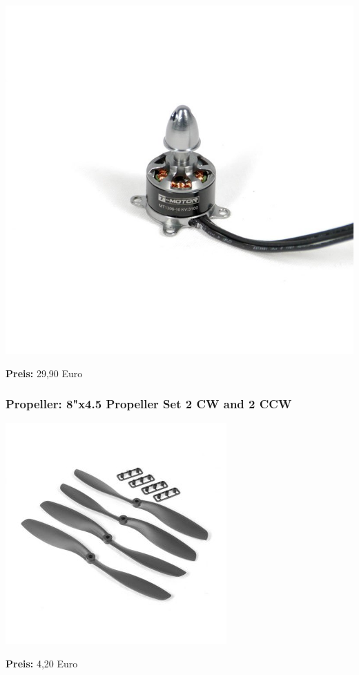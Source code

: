 \documentclass[12pt,a4paper]{article}
\begin{document}
\includegraphics[scale=0.2]{Bilder/T-Motor.jpg}

\textbf{Preis:} 29,90 Euro

\subsubsection*{Propeller: 8"x4.5 Propeller Set 2 CW and 2 CCW}
\includegraphics[scale=0.5]{Bilder/8Propeller.jpg}

\textbf{Preis:} 4,20 Euro
\end{document}
